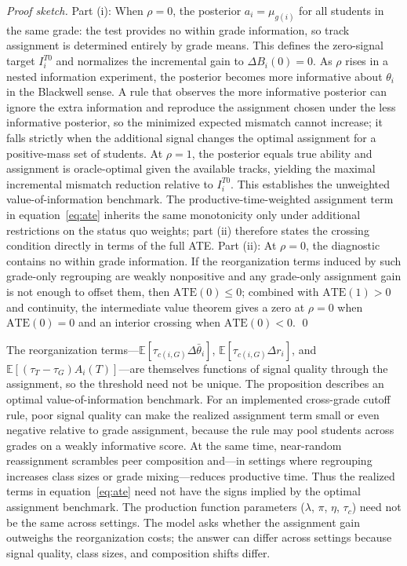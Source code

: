 \documentclass[11pt]{article}
\newcommand{\E}{\mathbb{E}}
\begin{document}
\noindent \emph{Proof sketch.} Part (i): When $\rho = 0$, the posterior $a_i = \mu_{g(i)}$ for all students in the same grade: the test provides no within grade information, so track assignment is determined entirely by grade means. This defines the zero-signal target $I_i^{T0}$ and normalizes the incremental gain to $\Delta B_i(0)=0$. As $\rho$ rises in a nested information experiment, the posterior becomes more informative about $\theta_i$ in the Blackwell sense. A rule that observes the more informative posterior can ignore the extra information and reproduce the assignment chosen under the less informative posterior, so the minimized expected mismatch cannot increase; it falls strictly when the additional signal changes the optimal assignment for a positive-mass set of students. At $\rho = 1$, the posterior equals true ability and assignment is oracle-optimal given the available tracks, yielding the maximal incremental mismatch reduction relative to $I_i^{T0}$. This establishes the unweighted value-of-information benchmark. The productive-time-weighted assignment term in equation~\eqref{eq:ate} inherits the same monotonicity only under additional restrictions on the status quo weights; part (ii) therefore states the crossing condition directly in terms of the full ATE\@. Part (ii): At $\rho = 0$, the diagnostic contains no within grade information. If the reorganization terms induced by such grade-only regrouping are weakly nonpositive and any grade-only assignment gain is not enough to offset them, then $\text{ATE}(0) \leq 0$; combined with $\text{ATE}(1)>0$ and continuity, the intermediate value theorem gives a zero at $\rho=0$ when $\text{ATE}(0)=0$ and an interior crossing when $\text{ATE}(0)<0$. \qed

The reorganization terms---$\E[\tau_{c(i,G)}\Delta\bar{\theta}_i]$, $\E[\tau_{c(i,G)}\Delta r_i]$, and $\E[(\tau_T - \tau_G)A_i(T)]$---are themselves functions of signal quality through the assignment, so the threshold need not be unique. The proposition describes an optimal value-of-information benchmark. For an implemented cross-grade cutoff rule, poor signal quality can make the realized assignment term small or even negative relative to grade assignment, because the rule may pool students across grades on a weakly informative score. At the same time, near-random reassignment scrambles peer composition and---in settings where regrouping increases class sizes or grade mixing---reduces productive time. Thus the realized terms in equation~\eqref{eq:ate} need not have the signs implied by the optimal assignment benchmark. The production function parameters ($\lambda$, $\pi$, $\eta$, $\tau_c$) need not be the same across settings. The model asks whether the assignment gain outweighs the reorganization costs; the answer can differ across settings because signal quality, class sizes, and composition shifts differ.
\end{document}
